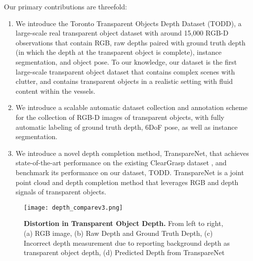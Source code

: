 \documentclass{article}
\newcommand{\algoName}{TranspareNet\xspace}
\newcommand{\dataName}{TODD}
\begin{document}
Our primary contributions are threefold: 
\begin{enumerate}[noitemsep,labelwidth=!,labelindent=0pt]
    \item We introduce the Toronto Transparent Objects Depth Dataset (\dataName), a large-scale real transparent object dataset with around 15,000 RGB-D observations that contain RGB, raw depths paired with ground truth depth (in which the depth at the transparent object is complete), instance segmentation, and object pose. To our knowledge, our dataset is the first large-scale transparent object dataset that contains complex scenes with clutter, and contains transparent objects in a realistic setting with fluid content within the vessels.
    \item We introduce a scalable automatic dataset collection and annotation scheme for the collection of RGB-D images of transparent objects, with fully automatic labeling of ground truth depth, 6DoF pose, as well as instance segmentation.
    \item We introduce a novel depth completion method, \algoName, that achieves state-of-the-art performance on the existing ClearGrasp dataset \citep{ClearGrasp}, and benchmark its performance on our dataset, \dataName. \algoName is a joint point cloud and depth completion method that leverages RGB and depth signals of transparent objects.  
\end{enumerate}
\begin{figure}[t]
\centering
\texttt{[image: depth\_comparev3.png]} \\
\caption{\textbf{Distortion in Transparent Object Depth.} From left to right, (a) RGB image, (b) Raw Depth and Ground Truth Depth, (c) Incorrect depth measurement due to reporting background depth as transparent object depth, (d) Predicted Depth from \algoName}
\label{fig:transparent_error}
\end{figure}


\end{document}

